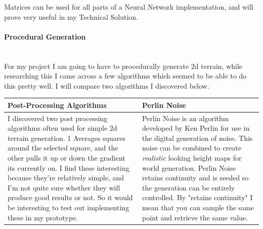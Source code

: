 \begin{flushleft}
                        Matrices can be used for all parts of a Neural Network implementation, and will prove very useful in my Technical
                        Solution. \\
                        \vspace{0.5cm}
                        
                        \pagebreak
                    \paragraph{Procedural Generation} \mbox{} \\
                        \vspace{0.2cm}
                        For my project I am going to have to procedurally generate 2d terrain, while researching this I came across a few algorithms
                        which seemed to be able to do this pretty well. I will compare two algorithms I discovered below.
                        
                        \begin{flushleft}
                            \begin{tabular}{| C{6cm} | C{6cm} |}
                                \hline
                                {\Large Post-Processing Algorithms} & {\Large Perlin Noise} \\
                                \hline
                                I discovered two post processing algorithms often used for simple 2d terrain generation. 1 Averages squares 
                                around the selected square, and the other pulls it up or down the gradient its currently on.
                                I find these interesting because they're relatively simple, and I'm not quite sure whether they will produce good results or not. 
                                \vspace{0.2cm}\linebreak
                                So it would be interesting to test out implementing these in my prototype.
                                &
                                Perlin Noise is an algorithm developed by Ken Perlin for use in the digital generation of noise.
                                This noise can be combined to create \textit{realistic} looking height maps for world generation.
                                Perlin Noise retains continuity and is seeded so the generation can be entirely controlled.
                                By "retains continuity" I mean that you can sample the same point and retrieve the same value. 
                                \vspace{0.2cm}\linebreak
                                

\end{tabular}
\end{flushleft}
\end{flushleft}
